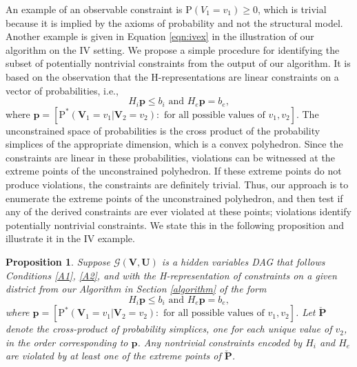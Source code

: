 \documentclass[12pt]{article}
\newtheorem{proposition}{Proposition}
\def\Pr{{\mathrm{P}}}
\def\Pdo{{\mathrm{P}^*}}
\newcommand{\bW}{\boldsymbol{W}}
\newcommand{\bU}{\boldsymbol{U}}
\newcommand{\bV}{\boldsymbol{V}}
\DeclareMathOperator{\Do}{do}
\begin{document}
An example of an observable constraint is $\Pr(V_1 = v_1) \geq 0$, which is trivial because it is implied by the axioms of probability and not the structural model. Another example is given in Equation \eqref{eqn:ivex} in the illustration of our algorithm on the IV setting. We propose a simple procedure for identifying the subset of potentially nontrivial constraints from the output of our algorithm. It is based on the observation that the H-representations are linear constraints on a vector of probabilities, i.e., 
\[
H_i \boldsymbol{{p}} \leq b_i
\mbox{ and }
H_e \boldsymbol{{p}} = b_e,
\]
where $\boldsymbol{{p}} = [\Pdo(\bV_1 = v_1 |\bV_2 = v_2): \mbox{ for all possible values of } v_1, v_2]$. The unconstrained space of probabilities is the cross product of the probability simplices of the appropriate dimension, which is a convex polyhedron. Since the constraints are linear in these probabilities, violations can be witnessed at the extreme points of the unconstrained polyhedron. If these extreme points do not produce violations, the constraints are definitely trivial. Thus, our approach is to enumerate the extreme points of the unconstrained polyhedron, and then test if any of the derived constraints are ever violated at these points; violations identify potentially nontrivial constraints. We state this in the following proposition and illustrate it in the IV example. 



\begin{proposition} \label{prop:nontrivial}
    Suppose $\mathcal{G}(\bV, \bU)$ is a hidden variables DAG that follows Conditions \ref{A1}, \ref{A2}, and with the H-representation of constraints on a given district from our Algorithm in Section \ref{algorithm} of the form
\[
H_i \boldsymbol{{p}} \leq b_i
\mbox{ and }
H_e \boldsymbol{{p}} = b_e,
\]
where $\boldsymbol{{p}} = [\Pdo(\bV_1 = v_1 |\bV_2 = v_2): \mbox{ for all possible values of } v_1, v_2]$.  Let $\boldsymbol{\check{P}}$ denote the cross-product of probability simplices, one for each unique value of $v_2$, in the order corresponding to $\boldsymbol{{p}}$. Any nontrivial constraints encoded by $H_i$ and $H_e$ are violated by at least one of the extreme points of  $\boldsymbol{\check{P}}$.
\end{proposition}

\end{document}

